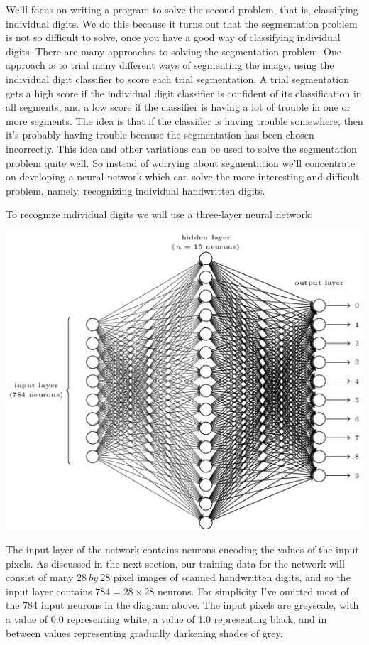 \documentclass[a4paper,12pt]{report}%
\begin{document}
\bigskip

We'll focus on writing a program to solve the second problem, that is, classifying individual digits. We do this because it turns out that the segmentation problem is not so difficult to solve, once you have a good way of classifying individual digits. There are many approaches to solving the segmentation problem. One approach is to trial many different ways of segmenting the image, using the individual digit classifier to score each trial segmentation. A trial segmentation gets a high score if the individual digit classifier is confident of its classification in all segments, and a low score if the classifier is having a lot of trouble in one or more segments. The idea is that if the classifier is having trouble somewhere, then it's probably having trouble because the segmentation has been chosen incorrectly. This idea and other variations can be used to solve the segmentation problem quite well. So instead of worrying about segmentation we'll concentrate on developing a neural network which can solve the more interesting and difficult problem, namely, recognizing individual handwritten digits.

To recognize individual digits we will use a three-layer neural network:

\begin{center}
 \includegraphics[width=0.85\linewidth]{images/tikz12.png}
\end{center}

The input layer of the network contains neurons encoding the values of the input pixels. As discussed in the next section, our training data for the network will consist of many $28~by~28$ pixel images of scanned handwritten digits, and so the input layer contains $784=28 \times 28$ neurons. For simplicity I've omitted most of the 784 input neurons in the diagram above. The input pixels are greyscale, with a value of 0.0 representing white, a value of 1.0 representing black, and in between values representing gradually darkening shades of grey.
\end{document}
